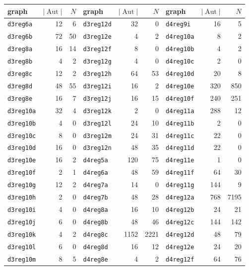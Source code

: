 \documentclass[12pt,letterpaper]{article}
\theoremstyle{definition}
\DeclareMathOperator{\Aut}{Aut}
\begin{document}
\begin{center}
\small
\begin{tabular}{lrr|lrr|lrr}
\hline
graph & $|\Aut|$ & $N$ & graph & $|\Aut|$ & $N$ & graph & $|\Aut|$ & $N$ \\
\hline
{\tt d3reg6a} & 12 & 6 & {\tt d3reg12d} & 32 & 0 & {\tt d4reg9i} & 16 & 5 \\
{\tt d3reg6b} & 72 & 50 & {\tt d3reg12e} & 4 & 2 & {\tt d4reg10a} & 8 & 2 \\
{\tt d3reg8a} & 16 & 14 & {\tt d3reg12f} & 8 & 0 & {\tt d4reg10b} & 4 & 2 \\
{\tt d3reg8b} & 4 & 2 & {\tt d3reg12g} & 4 & 0 & {\tt d4reg10c} & 2 & 0 \\
{\tt d3reg8c} & 12 & 2 & {\tt d3reg12h} & 64 & 53 & {\tt d4reg10d} & 20 & 8 \\
{\tt d3reg8d} & 48 & 55 & {\tt d3reg12i} & 16 & 2 & {\tt d4reg10e} & 320 & 850 \\
{\tt d3reg8e} & 16 & 7 & {\tt d3reg12j} & 16 & 15 & {\tt d4reg10f} & 240 & 251 \\
{\tt d3reg10a} & 32 & 4 & {\tt d3reg12k} & 2 & 0 & {\tt d4reg11a} & 288 & 12 \\
{\tt d3reg10b} & 4 & 0 & {\tt d3reg12l} & 24 & 10 & {\tt d4reg11b} & 2 & 0 \\
{\tt d3reg10c} & 8 & 0 & {\tt d3reg12m} & 24 & 31 & {\tt d4reg11c} & 22 & 0 \\
{\tt d3reg10d} & 16 & 0 & {\tt d3reg12n} & 48 & 35 & {\tt d4reg11d} & 22 & 0 \\
{\tt d3reg10e} & 16 & 2 & {\tt d4reg5a} & 120 & 75 & {\tt d4reg11e} & 1 & 0 \\
{\tt d3reg10f} & 2 & 1 & {\tt d4reg6a} & 48 & 59 & {\tt d4reg11f} & 64 & 30 \\
{\tt d3reg10g} & 12 & 2 & {\tt d4reg7a} & 14 & 0 & {\tt d4reg11g} & 144 & 9 \\
{\tt d3reg10h} & 2 & 0 & {\tt d4reg7b} & 48 & 28 & {\tt d4reg12a} & 768 & 7195 \\
{\tt d3reg10i} & 4 & 0 & {\tt d4reg8a} & 16 & 10 & {\tt d4reg12b} & 24 & 21 \\
{\tt d3reg10j} & 6 & 0 & {\tt d4reg8b} & 48 & 46 & {\tt d4reg12c} & 144 & 142 \\
{\tt d3reg10k} & 4 & 2 & {\tt d4reg8c} & 1152 & 2221 & {\tt d4reg12d} & 48 & 79 \\
{\tt d3reg10l} & 6 & 0 & {\tt d4reg8d} & 16 & 12 & {\tt d4reg12e} & 24 & 20 \\
{\tt d3reg10m} & 8 & 5 & {\tt d4reg8e} & 4 & 2 & {\tt d4reg12f} & 64 & 76 \\

\end{tabular}
\end{center}
\end{document}
